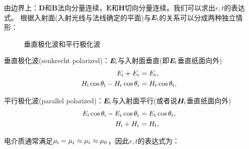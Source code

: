 由边界上：$\bm D$和$\bm B$法向分量连续，$\bm E$和$\bm H$切向分量连续。我们可以求出$r,t$的表达式。
根据入射面(入射光线与法线确定的平面)与$\bm E_\mathrm i$的关系可以分成两种独立情形：
\begin{figure}[!htp]
    \centering
    \caption{垂直极化波和平行极化波}
    \label{fig:senkrecht and parallel polarization}
\end{figure}
\begin{compactenum}
	\item 垂直极化波(senkrecht polarized)：$\bm E_\mathrm i$与入射面垂直(即$\bm E_\mathrm i$垂直纸面向外)%
	\begin{align*}
        E_\mathrm i + E_\mathrm r &= E_\mathrm t,\\
        H_\mathrm i\cos\theta_\mathrm i - H_\mathrm r\cos\theta_\mathrm r &= H_\mathrm t\cos\theta_\mathrm t,
    \end{align*}
    \item 平行极化波(parallel polarized)：$\bm E_\mathrm i$与入射面平行(或者说$\bm H_\mathrm i$垂直纸面向外)
    \begin{align*}
        E_\mathrm i\cos\theta_\mathrm i - E_\mathrm r\cos\theta_\mathrm r &= E_\mathrm t\cos\theta_\mathrm t,\\
        H_\mathrm i + H_\mathrm r &= H_\mathrm t,
    \end{align*}
\end{compactenum}
电介质通常满足$\mu_\mathrm i = \mu_\mathrm r \approx \mu_\mathrm t \approx \mu_0$，因此$r,t$的表达式为：
